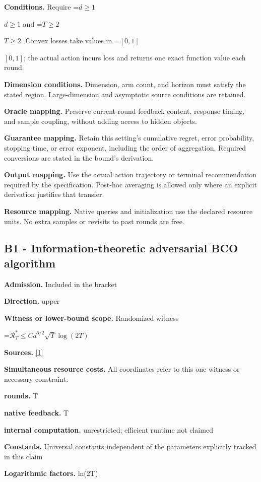 \documentclass[10pt,a4paper]{article}
\newcommand{\AtlasMath}[1]{\par\begingroup\centering\setbox0=\hbox{$\displaystyle #1$}\ifdim\wd0>1.4\linewidth\typeout{ATLAS WIDE FORMULA: \the\wd0}\fi\ifdim\wd0>\linewidth\resizebox{\linewidth}{!}{\box0}\else\box0\fi\par\endgroup}
\newcommand{\AtlasInlineMath}[1]{\begingroup\setbox0=\hbox{$#1$}\ifdim\wd0>.4\linewidth\endgroup\AtlasMath{#1}\else\endgroup$#1$\fi}
\begin{document}
\textbf{Conditions.} Require \AtlasInlineMath{d\ge1} and \AtlasInlineMath{T\ge2}. Convex losses take values in \AtlasInlineMath{[0,1]}; the actual action incurs loss and returns one exact function value each round.

\textbf{Dimension conditions.} Dimension, arm count, and horizon must satisfy the stated region. Large-dimension and asymptotic source conditions are retained.

\textbf{Oracle mapping.} Preserve current-round feedback content, response timing, and sample coupling, without adding access to hidden objects.

\textbf{Guarantee mapping.} Retain this setting's cumulative regret, error probability, stopping time, or error exponent, including the order of aggregation. Required conversions are stated in the bound's derivation.

\textbf{Output mapping.} Use the actual action trajectory or terminal recommendation required by the specification. Post-hoc averaging is allowed only where an explicit derivation justifies that transfer.

\textbf{Resource mapping.} Native queries and initialization use the declared resource units. No extra samples or revisits to past rounds are free.

\subsection{B1 - Information-theoretic adversarial BCO algorithm}
\textbf{Admission.} Included in the bracket

\textbf{Direction.} upper

\textbf{Witness or lower-bound scope.} Randomized witness

\AtlasMath{\mathcal{R}_T^*\le C d^{5/2}\sqrt T\log(2T)}
\textbf{Sources.} \href{https://tor-lattimore.com/downloads/papers/2020-cvx.pdf}{[1]}

\textbf{Simultaneous resource costs.} All coordinates refer to this one witness or necessary constraint.

\textbf{rounds.} T

\textbf{native feedback.} T

\textbf{internal computation.} unrestricted; efficient runtime not claimed

\textbf{Constants.} Universal constants independent of the parameters explicitly tracked in this claim

\textbf{Logarithmic factors.} ln(2T)
\end{document}
